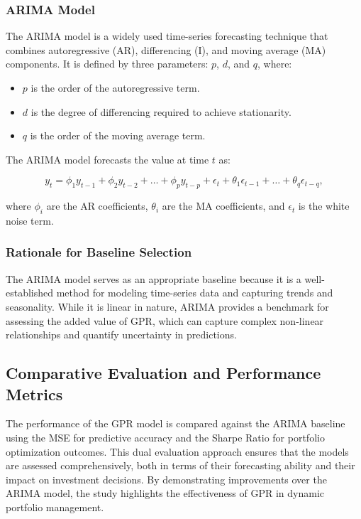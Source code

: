 \subsubsection{\ac{ARIMA} Model}

The \ac{ARIMA} model is a widely used time-series forecasting technique that combines autoregressive (AR), differencing (I), and moving average (MA) components. It is defined by three parameters: $p$, $d$, and $q$, where:

\begin{itemize}
    \item $p$ is the order of the autoregressive term.
    \item $d$ is the degree of differencing required to achieve stationarity.
    \item $q$ is the order of the moving average term.
\end{itemize}

The \ac{ARIMA} model forecasts the value at time $t$ as:

\begin{equation}
y_t = \phi_1 y_{t-1} + \phi_2 y_{t-2} + \dots + \phi_p y_{t-p} + \epsilon_t + \theta_1 \epsilon_{t-1} + \dots + \theta_q \epsilon_{t-q},
\end{equation}

where $\phi_i$ are the AR coefficients, $\theta_i$ are the MA coefficients, and $\epsilon_t$ is the white noise term.

\subsubsection{Rationale for Baseline Selection}

The \ac{ARIMA} model serves as an appropriate baseline because it is a well-established method for modeling time-series data and capturing trends and seasonality. While it is linear in nature, ARIMA provides a benchmark for assessing the added value of GPR, which can capture complex non-linear relationships and quantify uncertainty in predictions.

\subsection{Comparative Evaluation and Performance Metrics}

The performance of the \ac{GPR} model is compared against the \ac{ARIMA} baseline using the \ac{MSE} for predictive accuracy and the Sharpe Ratio for portfolio optimization outcomes. This dual evaluation approach ensures that the models are assessed comprehensively, both in terms of their forecasting ability and their impact on investment decisions. By demonstrating improvements over the \ac{ARIMA} model, the study highlights the effectiveness of \ac{GPR} in dynamic portfolio management.


